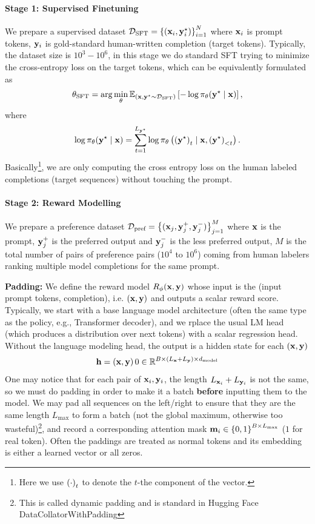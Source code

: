 \documentclass[11pt]{article}  %
\begin{document}
\paragraph{Stage 1: Supervised Finetuning} We prepare a supervised dataset $\mathcal{D}_{\text{SFT}} = \left\{ (\mathbf{x}_i, \mathbf{y}_i^\star) \right\}_{i=1}^N$ where $\mathbf{x}_i$ is prompt tokens, $\mathbf{y}_i$ is gold-standard human-written completion (target tokens). 
Typically, the dataset size is $10^3 - 10^6$, in this stage we do standard SFT trying to minimize the cross-entropy loss on the target tokens, which can be equivalently formulated as 
\begin{align*}
  \theta_{\text{SFT}} = \arg\min_{\theta} \mathbb{E}_{(\mathbf{x}, \mathbf{y}^\star \sim \mathcal{D}_{\text{SFT}})}\left[- \log \pi_{\theta}(\mathbf{y}^\star \mid \mathbf{x})\right],
\end{align*}
where 
\begin{align*}
  \log \pi_{\theta}(\mathbf{y}^\star \mid \mathbf{x}) = \sum_{t=1}^{L_{\mathbf{y}^\star}}\log \pi_{\theta}\left( \left( \mathbf{y}^\star \right)_t \mid \mathbf{x},  \left( \mathbf{y}^\star \right)_{<t} \right).
\end{align*}
Basically\footnote{Here we use $\left( \cdot \right)_t$ to denote the $t$-the component of the vector.}, we are only computing the cross entropy loss on the human labeled completions (target sequences) without touching the prompt.


\paragraph{Stage 2: Reward Modelling} We prepare a preference dataset $\mathcal{D}_{\text{pref}} = \left\{ (\mathbf{x}_j, \mathbf{y}_j^+, \mathbf{y}_j^-) \right\}_{j=1}^M$ where $\mathbf{x}$ is the prompt, $\mathbf{y}_j^+$ is the preferred output and $\mathbf{y}_j^-$ is the less preferred output, $M$ is the total number of pairs of preference pairs ($10^4$ to $10^6$) coming from human labelers ranking multiple model completions for the same prompt.


\textbf{Padding:} We define the reward model $R_{\phi}(\mathbf{x}, \mathbf{y})$ whose input is the (input prompt tokens, completion), i.e. $(\mathbf{x}, \mathbf{y})$ and outputs a scalar reward score.
Typically, we start with a base language model architecture (often the same type as the policy, e.g., Transformer decoder), and we rplace the usual LM head (which produces a distribution over next tokens) with a scalar regression head. 
Without the language modeling head, the output is a hidden state for each $(\mathbf{x}, \mathbf{y})$
\begin{align*}
  \mathbf{h} = \left( \mathbf{x}, \mathbf{y} \right)0 \in \mathbb{R}^{B \times (L_{\mathbf{x}} + L_{\mathbf{y}}) \times d_{\text{model}}}
\end{align*}
One may notice that for each pair of $\mathbf{x}_i, \mathbf{y}_i$, the length $L_{\mathbf{x}_i} + L_{\mathbf{y}_i}$ is not the same, so we must do padding in order to make it a batch \textbf{before} inputting them to the model.
We may pad all sequences on the left/right to ensure that they are the same length $L_{\max}$ to form a batch (not the global maximum, otherwise too wasteful)\footnote{This is called dynamic padding and is standard in Hugging Face DataCollatorWithPadding}, and record a corresponding attention mask $\mathbf{m}_i \in \left\{ 0, 1 \right\}^{B \times L_{\max}}$ ($1$ for real token).
Often the paddings are treated as normal tokens and its embedding is either a learned vector or all zeros. 
\end{document}
